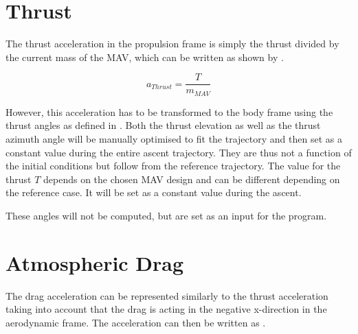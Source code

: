 



\section{Thrust}
\label{sec:thrustModel}
The thrust acceleration in the propulsion frame is simply the thrust divided by the current mass of the \ac{MAV}, which can be written as shown by .

\begin{equation} \label{eq:thrustModel}
a_{Thrust}=\dfrac{T}{m_{MAV}}
\end{equation}

\noindent
However, this acceleration has to be transformed to the body frame using the thrust angles as defined in . Both the thrust elevation as well as the thrust azimuth angle will be manually optimised to fit the trajectory and then set as a constant value during the entire ascent trajectory. They are thus not a function of the initial conditions but follow from the reference trajectory. The value for the thrust $T$ depends on the chosen \ac{MAV} design and can be different depending on the reference case. It will be set as a constant value during the ascent. 


\noindent
These angles will not be computed, but are set as an input for the program.


\section{Atmospheric Drag}
\label{sec:dragModel}
The drag acceleration can be represented similarly to the thrust acceleration taking into account that the drag is acting in the negative x-direction in the aerodynamic frame. The acceleration can then be written as .

